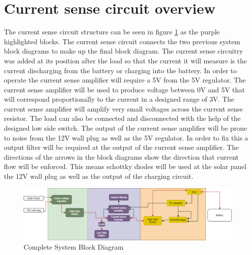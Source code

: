 \section{Current sense circuit overview}
The current sense circuit structure can be seen in figure \ref{fig:finalblock} as the purple highlighted blocks. The current sense circuit connects the two previous system block diagrams to make up the final block diagram.  The current sense circuitry was added at its position after the load so that the current it will measure is the current discharging from the battery or charging into the battery. In order to operate the current sense amplifier will require a 5V from the 5V regulator.  The current sense amplifier will be used to produce voltage between 0V and 5V that will correspond proportionally to the current in a designed range of 3V. The current sense amplifier will amplify very small voltages across the current sense resistor. The load can also be connected and disconnected with the help of the designed low side switch. The output of the current sense amplifier will be prone to noise from the 12V wall plug as well as the 5V regulator. In order to fix this a output filter will be required at the output of the current sense amplifier. The directions of the arrows in the block diagrams show the direction that current flow will be enforced. This means schottky diodes will be used at the solar panel the 12V wall plug as well as the output of the charging circuit. 

\begin{figure}[!htb]
\centering
\includegraphics[scale=0.45]{./Figures/A5}
\caption{Complete System Block Diagram}
\label{fig:finalblock}
\end{figure}
